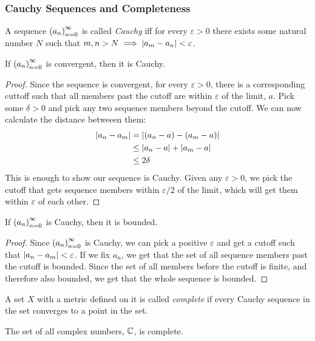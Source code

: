 \subsubsection{Cauchy Sequences and Completeness}
\begin{definition}
A sequence $\seq{a}$ is called \emph{Cauchy} iff for every $\varepsilon > 0$ there exists some natural number $N$ such that $m, n > N \implies \left\lvert a_m-a_n \right\rvert < \varepsilon$.
\end{definition}
\begin{lemma}
If $\seq{a}$ is convergent, then it is Cauchy.
\end{lemma}
\begin{proof}
Since the sequence is convergent, for every $\varepsilon > 0$, there is a corresponding cuttoff such that all members past the cutoff are within $\varepsilon$ of the limit, $a$. Pick some $\delta > 0$ and pick any two sequence members beyond the cutoff. We can now calculate the distance betweeen them:
\begin{align*}
\left\lvert a_n-a_m \right\rvert &= \left\lvert (a_n -a) - (a_m-a) \right\rvert\\
&\leq \left\lvert a_n - a \right\rvert + \left\lvert a_m - a \right\rvert\\
&\leq 2\delta
\end{align*}
This is enough to show our sequence is Cauchy. Given any $\varepsilon > 0$, we pick the cutoff that gets sequence members within $\varepsilon/2$ of the limit, which will get them within $\varepsilon$ of each other.
\end{proof}
\begin{lemma}
If $\seq{a}$ is Cauchy, then it is bounded.
\end{lemma}
\begin{proof}
Since $\seq{a}$ is Cauchy, we can pick a positive $\varepsilon$ and get a cutoff such that $\left\lvert a_n-a_m \right\rvert < \varepsilon$. If we fix $a_n$, we get that the set of all sequence members past the cutoff is bounded. Since the set of all members before the cutoff is finite, and therefore also bounded, we get that the whole sequence is bounded.
\end{proof}
\begin{definition}[Completeness]
A set $X$ with a metric defined on it is called \emph{complete} if every Cauchy sequence in the set converges to a point in the set.
\end{definition}
\begin{theorem}[Completeness of $\C$]
The set of all complex numbers,  $\C$, is complete.
\end{theorem}
